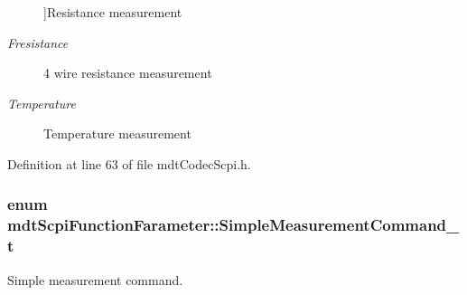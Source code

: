 \begin{Desc}
\begin{description}
{}]Resistance measurement \item[{\em 
\hypertarget{structmdt_scpi_function_farameter_a6c66a5f0deed788e511aa28e3683cf7ea09fa2c6ad3391741f7e0c728c00d04a7}{Fresistance}\label{structmdt_scpi_function_farameter_a6c66a5f0deed788e511aa28e3683cf7ea09fa2c6ad3391741f7e0c728c00d04a7}
}]4 wire resistance measurement \item[{\em 
\hypertarget{structmdt_scpi_function_farameter_a6c66a5f0deed788e511aa28e3683cf7eaee7a8e262285ed49ea1b4e4ae11525bd}{Temperature}\label{structmdt_scpi_function_farameter_a6c66a5f0deed788e511aa28e3683cf7eaee7a8e262285ed49ea1b4e4ae11525bd}
}]Temperature measurement \end{description}
\end{Desc}


Definition at line 63 of file mdt\-Codec\-Scpi.\-h.

\hypertarget{structmdt_scpi_function_farameter_a45845a283cab9adc77c0b9e9b00179bb}{
\subsubsection[{Simple\-Measurement\-Command\-\_\-t}]{\setlength{\rightskip}{0pt plus 5cm}enum {\bf mdt\-Scpi\-Function\-Farameter\-::\-Simple\-Measurement\-Command\-\_\-t}\hspace{0.3cm}{\ttfamily [strong]}}}\label{structmdt_scpi_function_farameter_a45845a283cab9adc77c0b9e9b00179bb}


Simple measurement command. 

